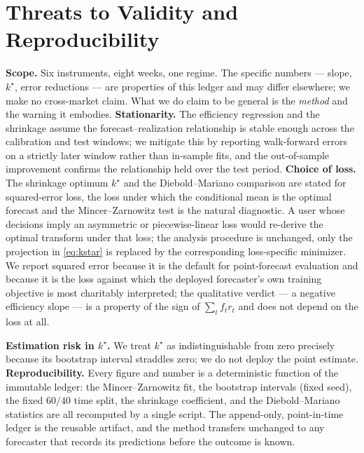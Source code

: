 \documentclass[10pt,twocolumn,twoside]{eec_style}
\begin{document}
\section{Threats to Validity and Reproducibility}
\label{sec:threats}
\textbf{Scope.} Six instruments, eight weeks, one regime. The specific numbers ---
slope, $k^\star$, error reductions --- are properties of this ledger and may differ
elsewhere; we make no cross-market claim. What we do claim to be general is the
\emph{method} and the warning it embodies. \textbf{Stationarity.} The efficiency
regression and the shrinkage assume the forecast--realization relationship is stable
enough across the calibration and test windows; we mitigate this by reporting
walk-forward errors on a strictly later window rather than in-sample fits, and the
out-of-sample improvement confirms the relationship held over the test period.
\textbf{Choice of loss.} The shrinkage optimum $k^\star$ and the Diebold--Mariano
comparison are stated for squared-error loss, the loss under which the conditional mean
is the optimal forecast and the Mincer--Zarnowitz test is the natural diagnostic. A user
whose decisions imply an asymmetric or piecewise-linear loss would re-derive the optimal
transform under that loss; the analysis procedure is unchanged, only the projection in
\eqref{eq:kstar} is replaced by the corresponding loss-specific minimizer. We report
squared error because it is the default for point-forecast evaluation and because it is
the loss against which the deployed forecaster's own training objective is most
charitably interpreted; the qualitative verdict --- a negative efficiency slope --- is a
property of the sign of $\sum_t f_t r_t$ and does not depend on the loss at all.

\textbf{Estimation risk in $k^\star$.} We treat $k^\star$ as indistinguishable from
zero precisely because its bootstrap interval straddles zero; we do not deploy the point
estimate. \textbf{Reproducibility.} Every figure and number is a deterministic function
of the immutable ledger: the Mincer--Zarnowitz fit, the bootstrap intervals (fixed
seed), the fixed $60/40$ time split, the shrinkage coefficient, and the
Diebold--Mariano statistics are all recomputed by a single script. The append-only,
point-in-time ledger is the reusable artifact, and the method transfers unchanged to any
forecaster that records its predictions before the outcome is known.
\end{document}
